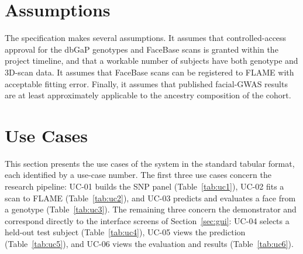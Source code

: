 \section{Assumptions}
The specification makes several assumptions. It assumes that controlled-access approval for the dbGaP genotypes and FaceBase scans is granted within the project timeline, and that a workable number of subjects have both genotype and 3D-scan data. It assumes that FaceBase scans can be registered to FLAME with acceptable fitting error. Finally, it assumes that published facial-GWAS results are at least approximately applicable to the ancestry composition of the cohort.

\section{Use Cases}
\label{sec:usecases}
This section presents the use cases of the system in the standard tabular format, each identified by a use-case number. The first three use cases concern the research pipeline: UC-01 builds the SNP panel (Table~\ref{tab:uc1}), UC-02 fits a scan to FLAME (Table~\ref{tab:uc2}), and UC-03 predicts and evaluates a face from a genotype (Table~\ref{tab:uc3}). The remaining three concern the demonstrator and correspond directly to the interface screens of Section~\ref{sec:gui}: UC-04 selects a held-out test subject (Table~\ref{tab:uc4}), UC-05 views the prediction (Table~\ref{tab:uc5}), and UC-06 views the evaluation and results (Table~\ref{tab:uc6}).

